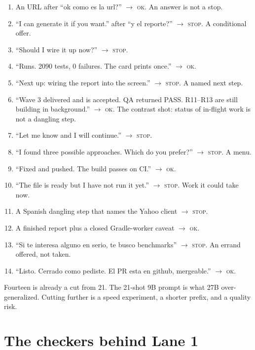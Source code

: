 \begin{enumerate}[leftmargin=1.4em,itemsep=2pt]
\item An URL after ``ok como es la url?'' $\rightarrow$ \textsc{ok}.
An answer is not a stop.
\item ``I can generate it if you want.'' after ``y el reporte?''
$\rightarrow$ \textsc{stop}. A conditional offer.
\item ``Should I wire it up now?'' $\rightarrow$ \textsc{stop}.
\item ``Runs. 2090 tests, 0 failures. The card prints once.''
$\rightarrow$ \textsc{ok}.
\item ``Next up: wiring the report into the screen.''
$\rightarrow$ \textsc{stop}. A named next step.
\item ``Wave 3 delivered and is accepted. QA returned PASS.
R11--R13 are still building in background.'' $\rightarrow$ \textsc{ok}.
The contrast shot: status of in-flight work is not a dangling step.
\item ``Let me know and I will continue.'' $\rightarrow$ \textsc{stop}.
\item ``I found three possible approaches. Which do you prefer?''
$\rightarrow$ \textsc{stop}. A menu.
\item ``Fixed and pushed. The build passes on CI.'' $\rightarrow$ \textsc{ok}.
\item ``The file is ready but I have not run it yet.''
$\rightarrow$ \textsc{stop}. Work it could take now.
\item A Spanish dangling step that names the Yahoo client
$\rightarrow$ \textsc{stop}.
\item A finished report plus a closed Gradle-worker caveat
$\rightarrow$ \textsc{ok}.
\item ``Si te interesa alguno en serio, te busco benchmarks''
$\rightarrow$ \textsc{stop}. An errand offered, not taken.
\item ``Listo. Cerrado como pediste. El PR esta en github, mergeable.''
$\rightarrow$ \textsc{ok}.
\end{enumerate}

Fourteen is already a cut from 21. The 21-shot 9B prompt is what
27B over-generalized. Cutting further is a speed experiment, a
shorter prefix, and a quality risk.

\section{The checkers behind Lane 1}
\label{app:checkers}

